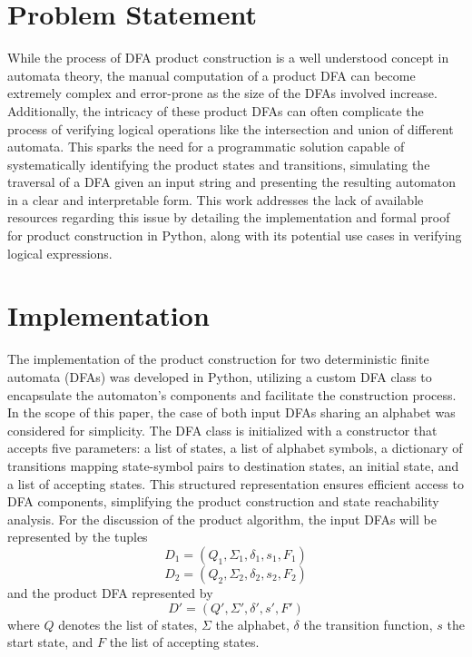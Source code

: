 \documentclass[conference]{IEEEtran}
\begin{document}
\section{Problem Statement}
While the process of DFA product construction is a well understood concept in automata theory, the manual computation of a product DFA can become extremely complex and error-prone as the size of the DFAs involved increase. Additionally, the intricacy of these product DFAs can often complicate the process of verifying logical operations like the intersection and union of different automata. This sparks the need for a programmatic solution capable of systematically identifying the product states and transitions, simulating the traversal of a DFA given an input string and presenting the resulting automaton in a clear and interpretable form. This work addresses the lack of available resources regarding this issue by detailing the implementation and formal proof for product construction in Python, along with its potential use cases in verifying logical expressions.

\section{Implementation}
The implementation of the product construction for two deterministic finite automata (DFAs) was developed in Python, utilizing a custom DFA class to encapsulate the automaton’s components and facilitate the construction process. In the scope of this paper, the case of both input DFAs sharing an alphabet was considered for simplicity. The DFA class is initialized with a constructor that accepts five parameters: a list of states, a list of alphabet symbols, a dictionary of transitions mapping state-symbol pairs to destination states, an initial state, and a list of accepting states. This structured representation ensures efficient access to DFA components, simplifying the product construction and state reachability analysis. For the discussion of the product algorithm, the input DFAs will be represented by the tuples
\[ D_1 = (Q_1, \Sigma_1, \delta_1, s_1, F_1) \]
\[ D_2 = (Q_2, \Sigma_2, \delta_2, s_2, F_2) \]
and the product DFA represented by
\[ D' = (Q', \Sigma', \delta', s', F') \]
where $Q$ denotes the list of states, $\Sigma$ the alphabet, $\delta$ the transition function, $s$ the start state, and $F$ the list of accepting states. 
\end{document}
